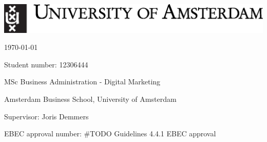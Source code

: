 \makeatletter
\begin{titlepage}
  \begin{center}
    \includegraphics[scale=0.5]{images/uva_logo.eps}

    \vspace{0.8cm}

    \huge{\textbf{\@title}}

    \vspace{0.8cm}

    \large{\@author}

    \normalsize{\today}

  \end{center}

  \vfill

  \normalsize

  Student number: 12306444

  MSc Business Administration - Digital Marketing

  Amsterdam Business School, University of Amsterdam

  Supervisor: Joris Demmers

  EBEC approval number: \#TODO Guidelines 4.4.1 EBEC approval

\end{titlepage}
\makeatother

